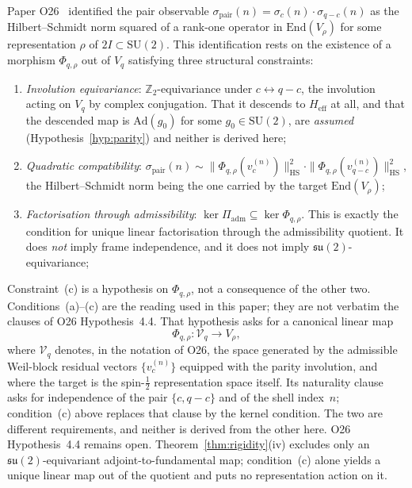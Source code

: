 \documentclass[11pt,a4paper]{article}
\theoremstyle{remark}
\begin{document}
    Paper O26~\cite{Beau2026a30} identified the pair observable $\sigma_{\mathrm{pair}}(n) =
  \sigma_c(n) \cdot \sigma_{q-c}(n)$ as the Hilbert--Schmidt norm squared of a rank-one operator
    in $\mathrm{End}(V_\rho)$ for some representation $\rho$ of $2I \subset \mathrm{SU}(2)$.
    This identification rests on the existence of a morphism $\Phi_{q,\rho}$ out of $V_q$
    satisfying three structural constraints:
    \begin{enumerate}
      \item[(a)] \emph{Involution equivariance}: $\mathbb{Z}_2$-equivariance under $c \leftrightarrow
      q - c$, the involution acting on $V_q$ by complex conjugation.
      That it descends to $H_{\mathrm{eff}}$ at all, and that the descended map is
      $\mathrm{Ad}(g_0)$ for some $g_0 \in \mathrm{SU}(2)$, are \emph{assumed}
      (Hypothesis~\ref{hyp:parity}) and neither is derived here;
      \item[(b)] \emph{Quadratic compatibility}: $\sigma_{\mathrm{pair}}(n) \sim
      \|\Phi_{q,\rho}(v^{(n)}_c)\|_{\mathrm{HS}}^2 \cdot
      \|\Phi_{q,\rho}(v^{(n)}_{q-c})\|_{\mathrm{HS}}^2$, the Hilbert--Schmidt norm being the one
      carried by the target $\mathrm{End}(V_\rho)$;
      \item[(c)] \emph{Factorisation through admissibility}: $\ker \Pi_{\mathrm{adm}} \subseteq \ker
      \Phi_{q,\rho}$.
      This is exactly the condition for unique linear factorisation through the admissibility
      quotient.
      It does \emph{not} imply frame independence, and it does not imply
      $\mathfrak{su}(2)$-equivariance;
    \end{enumerate}
    Constraint~(c) is a hypothesis on $\Phi_{q,\rho}$, not a consequence of the other two.
    Conditions~(a)--(c) are the reading used in this paper; they are not verbatim the clauses of
    O26 Hypothesis~4.4.
    That hypothesis asks for a canonical linear map
    \[
      \Phi_{q,\rho} \colon \mathcal{V}_q \longrightarrow V_\rho ,
    \]
    where $\mathcal{V}_q$ denotes, in the notation of O26, the space generated by the admissible
    Weil-block residual vectors $\{v^{(n)}_c\}$ equipped with the parity involution, and where the
    target is the spin-$\tfrac{1}{2}$ representation space itself.
    Its naturality clause asks for independence of the pair $\{c, q-c\}$ and of the shell
    index~$n$; condition~(c) above replaces that clause by the kernel condition.
    The two are different requirements, and neither is derived from the other here.
    O26 Hypothesis~4.4 remains open.
    Theorem~\ref{thm:rigidity}(iv) excludes only an $\mathfrak{su}(2)$-equivariant
    adjoint-to-fundamental map; condition~(c) alone yields a unique linear map out of the quotient
    and puts no representation action on it.
\end{document}
